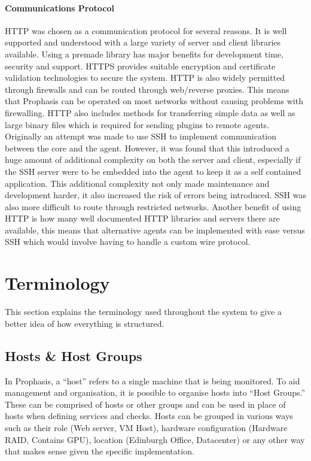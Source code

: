 \documentclass[bsc,deptreport,twoside,parskip,singlespacing,notimes]{infthesis}
\begin{document}
\paragraph*{Communications Protocol}
	HTTP was chosen as a communication protocol for several reasons.  It is well
	supported and understood with a large variety of server and client libraries
	available.  Using a premade library has major benefits for development time,
	security and support. HTTPS provides suitable encryption and certificate
	validation technologies to secure the system. HTTP is also widely permitted
	through firewalls and can be routed through web/reverse proxies.  This means
	that Prophasis can be operated on most networks without causing problems with
	firewalling.  HTTP also includes methods for transferring simple data as well
	as large binary files which is required for sending plugins to remote agents.
	Originally an attempt was made to use SSH to implement communication between
	the core and the agent.  However, it was found that this introduced a huge
	amount of additional complexity on both the server and client, especially if
	the SSH server were to be embedded into the agent to keep it as a self
	contained application.  This additional complexity not only made maintenance
	and development harder, it also increased the risk of errors being introduced.
	SSH was also more difficult to route through restricted networks.  Another
	benefit of using HTTP is how many well documented HTTP libraries and servers
	there are available, this means that alternative agents can be implemented with
	ease versus SSH which would involve having to handle a custom wire protocol.

\section{Terminology}

	This section explains the terminology used throughout the system to give a
	better idea of how everything is structured.

\subsection{Hosts \& Host Groups}

	In Prophasis, a ``host'' refers to a single machine that is being monitored. To
	aid management and organisation, it is possible to organise hosts into ``Host
	Groups.''  These can be comprised of hosts or other groups and can be used in
	place of hosts when defining services and checks.  Hosts can be grouped in
	various ways such as their role (Web server, VM Host), hardware configuration
	(Hardware RAID, Contains GPU), location (Edinburgh Office, Datacenter) or any
	other way that makes sense given the specific implementation.
\end{document}
